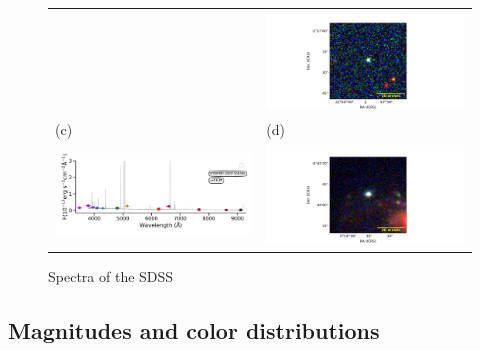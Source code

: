 \documentclass[fleqn,usenatbib]{mnras}
\begin{document}
{\begin{figure}
\begin{tabular}{ll}
    & \includegraphics[width=0.4\linewidth, trim=10 0 10 20, clip]{Figs/STRIPE82-0147-005730_343-1_100_r.pdf} \\
    (c) & (d) \\
    \includegraphics[trim=10 0 10 20, clip]{Figs/spec-1089-52913-0196-STRIPE82-0007-024265.pdf}
    & \includegraphics[width=0.4\linewidth, trim=10 0 10 20, clip]{Figs/STRIPE82-0007-024265_3-0_100_r.pdf} \\
  \end{tabular}
  \caption{Spectra of the SDSS}
  \label{fig:color-diagram}
\end{figure}

\subsection{Magnitudes and color distributions}

}
\end{document}
